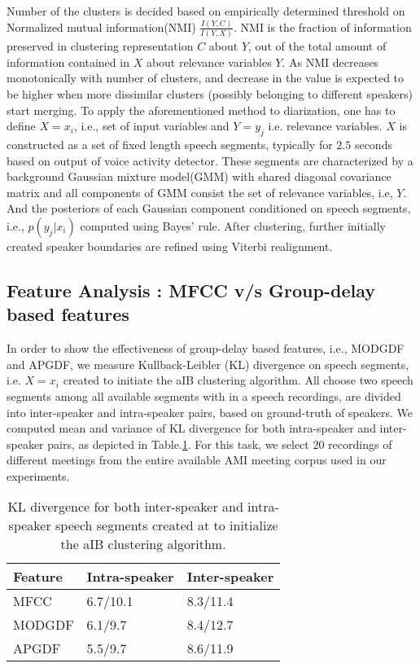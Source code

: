\documentclass[conference]{IEEEtran}
\begin{document}
Number of the clusters is decided based on empirically determined threshold on Normalized mutual information(NMI) $\frac{I(Y,C)}{I(Y,X)}$. NMI is the fraction of information preserved in clustering representation $C$ about $Y$, out of the total amount of information contained in $X$ about relevance variables $Y$. As NMI decreases monotonically with number of clusters, and decrease in the value is expected to be higher when more dissimilar clusters (possibly belonging to different speakers) start merging. To apply the aforementioned method to diarization, one has to define $X = {x_i}$, i.e., set of input variables and $Y = {y_j}$ i.e. relevance variables. $X$ is constructed as a set of fixed length speech segments, typically for $2.5$ seconds based on output of voice activity detector. These segments are characterized by a background Gaussian mixture model(GMM) with shared diagonal covariance matrix and all components of GMM consist the set of relevance variables, i.e, $Y$. And the posteriors of each Gaussian component conditioned on speech segments, i.e., $p(y_j|x_i)$ computed using Bayes' rule. After clustering, further initially created speaker boundaries are refined using Viterbi realignment.

\subsection{Feature Analysis : MFCC v/s Group-delay based features}

In order to show the effectiveness of group-delay based features, i.e., MODGDF and APGDF, we measure Kullback-Leibler (KL) divergence on speech segments, i.e. $X={x_i}$ created to initiate the aIB clustering algorithm. All choose two speech segments among all available segments with in a speech recordings, are divided into inter-speaker and intra-speaker pairs, based on ground-truth of speakers. We computed mean and variance of KL divergence for both intra-speaker and inter-speaker pairs, as depicted in Table.\ref{table:kl-div}. For this task, we select $20$ recordings of different meetings from the entire available AMI meeting corpus used in our experiments. 


\begin{table}[h]
\centering

\label{table:kl-div}
\begin{tabular}{|l|l|l|}
\hline
Feature 			& Intra-speaker 			& Inter-speaker 	 \\ \hline
MFCC          			& 6.7/10.1               & 8.3/11.4       \\ \hline
MODGDF        			& 6.1/9.7                & 8.4/12.7       \\ \hline
APGDF         			& 5.5/9.7                & 8.6/11.9        \\ \hline
\end{tabular}

\vspace{0.4cm}
\caption{KL divergence for both inter-speaker and intra-speaker speech segments created at to initialize the aIB clustering algorithm.}
\end{table}
\end{document}

